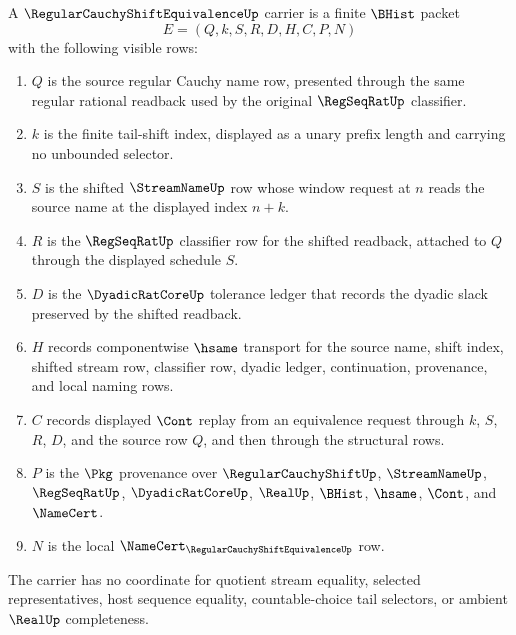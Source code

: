 \begin{definition}
\label{def:regular-cauchy-shift-equivalence-carrier}
A $\RegularCauchyShiftEquivalenceUp$ carrier is a finite $\BHist$ packet
$$
E=(Q,k,S,R,D,H,C,P,N)
$$
with the following visible rows:
\begin{enumerate}
\item $Q$ is the source regular Cauchy name row, presented through the same regular rational readback used by the original $\RegSeqRatUp$ classifier.
\item $k$ is the finite tail-shift index, displayed as a unary prefix length and carrying no unbounded selector.
\item $S$ is the shifted $\StreamNameUp$ row whose window request at $n$ reads the source name at the displayed index $n+k$.
\item $R$ is the $\RegSeqRatUp$ classifier row for the shifted readback, attached to $Q$ through the displayed schedule $S$.
\item $D$ is the $\DyadicRatCoreUp$ tolerance ledger that records the dyadic slack preserved by the shifted readback.
\item $H$ records componentwise $\hsame$ transport for the source name, shift index, shifted stream row, classifier row, dyadic ledger, continuation, provenance, and local naming rows.
\item $C$ records displayed $\Cont$ replay from an equivalence request through $k$, $S$, $R$, $D$, and the source row $Q$, and then through the structural rows.
\item $P$ is the $\Pkg$ provenance over $\RegularCauchyShiftUp$, $\StreamNameUp$, $\RegSeqRatUp$, $\DyadicRatCoreUp$, $\RealUp$, $\BHist$, $\hsame$, $\Cont$, and $\NameCert$.
\item $N$ is the local $\NameCert_{\RegularCauchyShiftEquivalenceUp}$ row.
\end{enumerate}
The carrier has no coordinate for quotient stream equality, selected representatives, host sequence equality, countable-choice tail selectors, or ambient $\RealUp$ completeness.
\end{definition}

